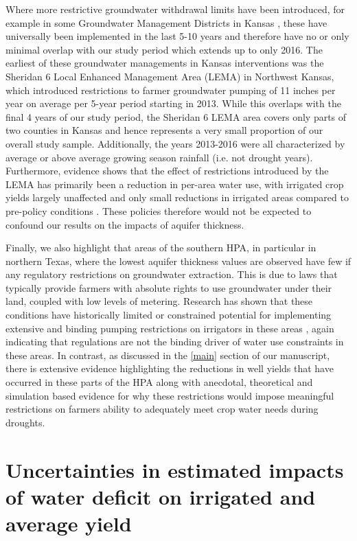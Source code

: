 \documentclass[
]{article}
\begin{document}
Where more restrictive groundwater withdrawal limits have been introduced, for example in some Groundwater Management Districts in Kansas \citep{marston2022, rimvsaite2023groundwater}, these have universally been implemented in the last 5-10 years and therefore have no or only minimal overlap with our study period which extends up to only 2016. The earliest of these groundwater managements in Kansas interventions was the Sheridan 6 Local Enhanced Management Area (LEMA) in Northwest Kansas, which introduced restrictions to farmer groundwater pumping of 11 inches per year on average per 5-year period starting in 2013. While this overlaps with the final 4 years of our study period, the Sheridan 6 LEMA area covers only parts of two counties in Kansas and hence represents a very small proportion of our overall study sample. Additionally, the years 2013-2016 were all characterized by average or above average growing season rainfall (i.e. not drought years). Furthermore, evidence shows that the effect of restrictions introduced by the LEMA has primarily been a reduction in per-area water use, with irrigated crop yields largely unaffected and only small reductions in irrigated areas compared to pre-policy conditions \citep{drysdale2018adaptation, deines2021combining}. These policies therefore would not be expected to confound our results on the impacts of aquifer thickness. 

Finally, we also highlight that areas of the southern HPA, in particular in northern Texas, where the lowest aquifer thickness values are observed have few if any regulatory restrictions on groundwater extraction. This is due to laws that typically provide farmers with absolute rights to use groundwater under their land, coupled with low levels of metering. Research has shown that these conditions have historically limited or constrained potential for implementing extensive and binding pumping restrictions on irrigators in these areas \citep{wheeler2016lessons, closas2018chronicle}, again indicating that regulations are not the binding driver of water use constraints in these areas. In contrast, as discussed in the \ref{main} section of our manuscript, there is extensive evidence highlighting the reductions in well yields that have occurred in these parts of the HPA along with anecdotal, theoretical and simulation based evidence for why these restrictions would impose meaningful restrictions on farmers ability to adequately meet crop water needs during droughts. 

\hypertarget{reg-conf}{%
\section{Uncertainties in estimated impacts of water deficit on irrigated and average yield}\label{reg-conf}}
\end{document}
